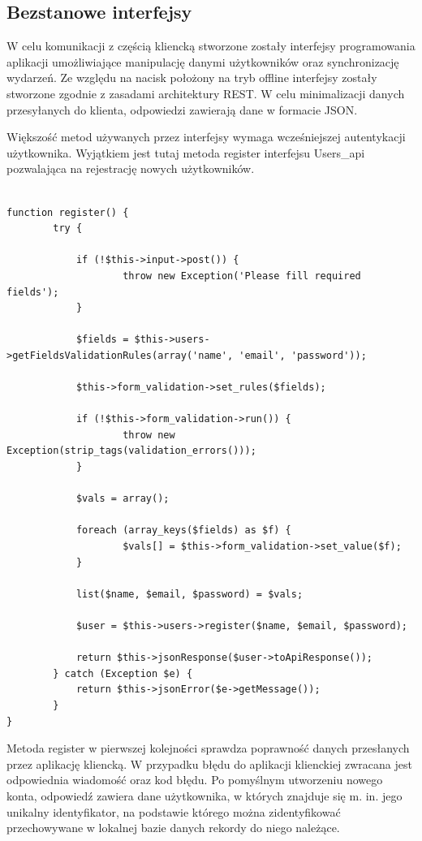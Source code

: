 \subsection{Bezstanowe interfejsy}
\label{bezstInter}

W celu komunikacji z częścią kliencką stworzone zostały interfejsy programowania aplikacji umożliwiające manipulację danymi użytkowników oraz synchronizację wydarzeń. Ze względu na nacisk położony na tryb offline interfejsy zostały stworzone zgodnie z zasadami architektury REST. W celu minimalizacji danych przesyłanych do klienta, odpowiedzi zawierają dane w formacie JSON.

Większość metod używanych przez interfejsy wymaga wcześniejszej autentykacji użytkownika. Wyjątkiem jest tutaj metoda register interfejsu Users\_api pozwalająca na rejestrację nowych użytkowników.

\begin{lstlisting}[caption=Rejestracja użytkowników przy użyciu metody register interfejsu Users\_api., label=amb, captionpos=b]

function register() {
    	try {

        	if (!$this->input->post()) {
            		throw new Exception('Please fill required fields');
        	}

        	$fields = $this->users->getFieldsValidationRules(array('name', 'email', 'password'));

        	$this->form_validation->set_rules($fields);

        	if (!$this->form_validation->run()) {
            		throw new Exception(strip_tags(validation_errors()));
        	}

        	$vals = array();

        	foreach (array_keys($fields) as $f) {
            		$vals[] = $this->form_validation->set_value($f);
        	}

        	list($name, $email, $password) = $vals;

        	$user = $this->users->register($name, $email, $password);

        	return $this->jsonResponse($user->toApiResponse());
    	} catch (Exception $e) {
        	return $this->jsonError($e->getMessage());
    	}
}

\end{lstlisting}

Metoda register w pierwszej kolejności sprawdza poprawność danych przesłanych przez aplikację kliencką. W przypadku błędu do aplikacji klienckiej zwracana jest odpowiednia wiadomość oraz kod błędu. Po pomyślnym utworzeniu nowego konta, odpowiedź zawiera  dane użytkownika, w których znajduje się m. in. jego unikalny identyfikator, na podstawie którego można zidentyfikować przechowywane w lokalnej bazie danych rekordy do niego należące.

